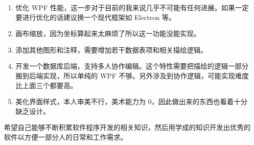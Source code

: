 \begin{enumerate}
  \item 优化 WPF 性能，这一步对于目前的我来说几乎不可能有任何进展。如果一定要进行优化的话建议换一个现代框架如 Electron 等。
  \item 画布缩放，因为坐标算起来太麻烦了所以这一功能没能实现。
  \item 添加其他图形和注释，需要增加若干数据表项和相关描绘逻辑。
  \item 开发一个数据库后端，支持多人协作编辑。这个特性需要把描绘的逻辑一部分搬到后端实现，所以单纯的 WPF 不够。另外涉及到协作逻辑，可能实现难度比上面三个都要高。
  \item 美化界面样式，本人审美不行，美术能力为 0，因此做出来的东西也看着十分缺乏设计。
\end{enumerate}

希望自己能够不断积累软件程序开发的相关知识，然后用学成的知识开发出优秀的软件以方便一部分人的日常和工作需求。
